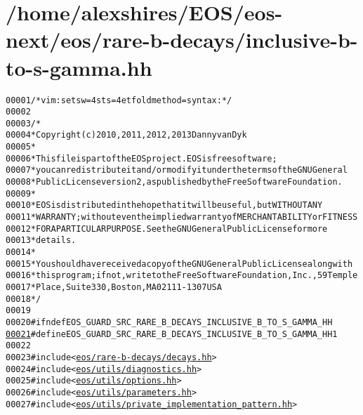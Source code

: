 \hypertarget{inclusive-b-to-s-gamma_8hh_source}{
\section{/home/alexshires/EOS/eos-\/next/eos/rare-\/b-\/decays/inclusive-\/b-\/to-\/s-\/gamma.hh}
}


\begin{footnotesize}\begin{alltt}
00001 \textcolor{comment}{/* vim: set sw=4 sts=4 et foldmethod=syntax : */}
00002 
00003 \textcolor{comment}{/*}
00004 \textcolor{comment}{ * Copyright (c) 2010, 2011, 2012, 2013 Danny van Dyk}
00005 \textcolor{comment}{ *}
00006 \textcolor{comment}{ * This file is part of the EOS project. EOS is free software;}
00007 \textcolor{comment}{ * you can redistribute it and/or modify it under the terms of the GNU General}
00008 \textcolor{comment}{ * Public License version 2, as published by the Free Software Foundation.}
00009 \textcolor{comment}{ *}
00010 \textcolor{comment}{ * EOS is distributed in the hope that it will be useful, but WITHOUT ANY}
00011 \textcolor{comment}{ * WARRANTY; without even the implied warranty of MERCHANTABILITY or FITNESS}
00012 \textcolor{comment}{ * FOR A PARTICULAR PURPOSE.  See the GNU General Public License for more}
00013 \textcolor{comment}{ * details.}
00014 \textcolor{comment}{ *}
00015 \textcolor{comment}{ * You should have received a copy of the GNU General Public License along with}
00016 \textcolor{comment}{ * this program; if not, write to the Free Software Foundation, Inc., 59 Temple}
00017 \textcolor{comment}{ * Place, Suite 330, Boston, MA  02111-1307  USA}
00018 \textcolor{comment}{ */}
00019 
00020 \textcolor{preprocessor}{#ifndef EOS\_GUARD\_SRC\_RARE\_B\_DECAYS\_INCLUSIVE\_B\_TO\_S\_GAMMA\_HH}
\hypertarget{inclusive-b-to-s-gamma_8hh_source_l00021}{}\hyperlink{inclusive-b-to-s-gamma_8hh_a11a2e97fb82dee569be0903a8b93df5c}{00021} \textcolor{preprocessor}{}\textcolor{preprocessor}{#define EOS\_GUARD\_SRC\_RARE\_B\_DECAYS\_INCLUSIVE\_B\_TO\_S\_GAMMA\_HH 1}
00022 \textcolor{preprocessor}{}
00023 \textcolor{preprocessor}{#include <\hyperlink{decays_8hh}{eos/rare-b-decays/decays.hh}>}
00024 \textcolor{preprocessor}{#include <\hyperlink{diagnostics_8hh}{eos/utils/diagnostics.hh}>}
00025 \textcolor{preprocessor}{#include <\hyperlink{options_8hh}{eos/utils/options.hh}>}
00026 \textcolor{preprocessor}{#include <\hyperlink{parameters_8hh}{eos/utils/parameters.hh}>}
00027 \textcolor{preprocessor}{#include <\hyperlink{private__implementation__pattern_8hh}{eos/utils/private_implementation_pattern.hh}>}

\end{alltt}
\end{footnotesize}
